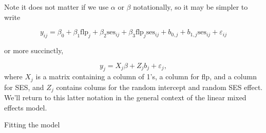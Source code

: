 \documentclass[ignorenonframetext,]{beamer}
\newenvironment{Shaded}{\begin{snugshade}}{\end{snugshade}}
\newcommand{\KeywordTok}[1]{\textcolor[rgb]{0.13,0.29,0.53}{\textbf{#1}}}
\newcommand{\DataTypeTok}[1]{\textcolor[rgb]{0.13,0.29,0.53}{#1}}
\newcommand{\StringTok}[1]{\textcolor[rgb]{0.31,0.60,0.02}{#1}}
\newcommand{\OtherTok}[1]{\textcolor[rgb]{0.56,0.35,0.01}{#1}}
\newcommand{\OperatorTok}[1]{\textcolor[rgb]{0.81,0.36,0.00}{\textbf{#1}}}
\newcommand{\NormalTok}[1]{#1}
\begin{document}
\begin{frame}{}

Note it does not matter if we use \(\alpha\) or \(\beta\) notationally,
so it may be simpler to write

\[y_{ij}=\beta_0+\beta_1\text{flp}_j+\beta_2\text{ses}_{ij}+\beta_3\text{flp}_j\text{ses}_{ij}+b_{0,j}+b_{1,j}\text{ses}_{ij}+\varepsilon_{ij}\]

or more succinctly,

\[y_j=X_j\beta+Z_jb_j+\varepsilon_j,\] where \(X_j\) is a matrix
containing a column of 1's, a column for flp, and a column for SES, and
\(Z_j\) contains colums for the random intercept and random SES effect.
We'll return to this latter notation in the general context of the
linear mixed effects model.

\end{frame}

\begin{frame}[fragile]{Fitting the model}

\begin{Shaded}
\end{Shaded}

\end{frame}
\end{document}
